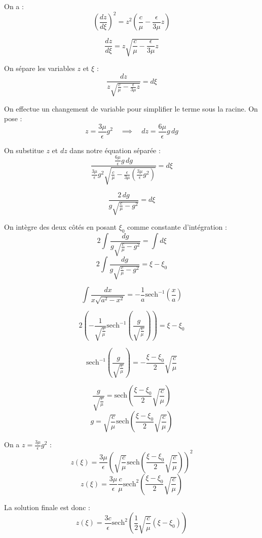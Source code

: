 \documentclass[12pt,a4paper]{article}
\begin{document}


On a :
\[ \left(\frac{dz}{d\xi}\right)^{2} = z^{2}\left(\frac{c}{\mu}-\frac{\epsilon}{3\mu}z\right) \]

\[ \frac{dz}{d\xi} = z\sqrt{\frac{c}{\mu}-\frac{\epsilon}{3\mu}z} \]

On sépare les variables $z$ et $\xi$ :
\[ \frac{dz}{z\sqrt{\frac{c}{\mu}-\frac{\epsilon}{3\mu}z}} = d\xi \]

On effectue un changement de variable pour simplifier le terme sous la racine. 
On pose :
\[ z = \frac{3\mu}{\epsilon}g^2 \quad \implies \quad dz = \frac{6\mu}{\epsilon}g \, dg \]

On substitue $z$ et $dz$ dans notre équation séparée :
\[ \frac{\frac{6\mu}{\epsilon}g \, dg}{\frac{3\mu}{\epsilon}g^2 \sqrt{\frac{c}{\mu}-\frac{\epsilon}{3\mu}\left(\frac{3\mu}{\epsilon}g^2\right)}} = d\xi \]

\[ \frac{2 \, dg}{g \sqrt{\frac{c}{\mu}-g^2}} = d\xi \]

On intègre des deux côtés en posant $\xi_0$ comme constante d'intégration :
\[ 2 \int \frac{dg}{g \sqrt{\frac{c}{\mu}-g^2}} = \int d\xi \]
\[ 2 \int \frac{dg}{g \sqrt{\frac{c}{\mu}-g^2}} = \xi - \xi_0 \]

\[ \int \frac{dx}{x\sqrt{a^2-x^2}} = -\frac{1}{a} \text{sech}^{-1}\left(\frac{x}{a}\right) \]

\[ 2 \left( - \frac{1}{\sqrt{\frac{c}{\mu}}} \text{sech}^{-1}\left(\frac{g}{\sqrt{\frac{c}{\mu}}}\right) \right) = \xi - \xi_0 \]

\[ \text{sech}^{-1}\left(\frac{g}{\sqrt{\frac{c}{\mu}}}\right) = -\frac{\xi - \xi_0}{2} \sqrt{\frac{c}{\mu}} \]

\[ \frac{g}{\sqrt{\frac{c}{\mu}}} = \text{sech}\left( \frac{\xi - \xi_0}{2} \sqrt{\frac{c}{\mu}} \right) \]
\[ g = \sqrt{\frac{c}{\mu}} \text{sech}\left( \frac{\xi - \xi_0}{2} \sqrt{\frac{c}{\mu}} \right) \]

On a $z = \frac{3\mu}{\epsilon}g^2$ :
\[ z(\xi) = \frac{3\mu}{\epsilon} \left( \sqrt{\frac{c}{\mu}} \text{sech}\left( \frac{\xi - \xi_0}{2} \sqrt{\frac{c}{\mu}} \right) \right)^2 \]
\[ z(\xi) = \frac{3\mu}{\epsilon} \frac{c}{\mu} \text{sech}^2\left( \frac{\xi - \xi_0}{2} \sqrt{\frac{c}{\mu}} \right) \]

La solution finale est donc :
\[ z(\xi) = \frac{3c}{\epsilon} \text{sech}^2\left( \frac{1}{2}\sqrt{\frac{c}{\mu}}(\xi - \xi_0) \right) \]
\end{document}
